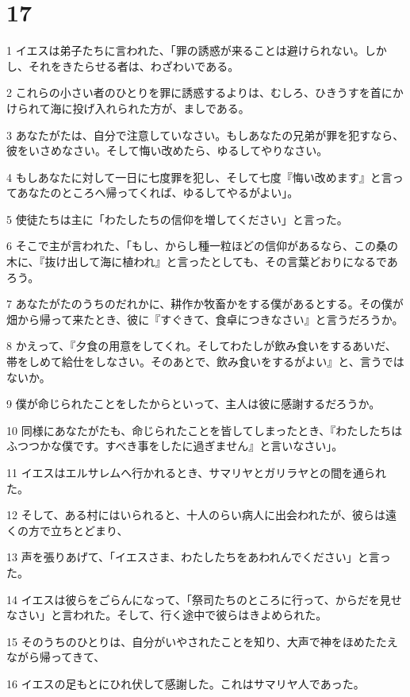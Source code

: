 \chapter{17}

\par 1 イエスは弟子たちに言われた、「罪の誘惑が来ることは避けられない。しかし、それをきたらせる者は、わざわいである。
\par 2 これらの小さい者のひとりを罪に誘惑するよりは、むしろ、ひきうすを首にかけられて海に投げ入れられた方が、ましである。
\par 3 あなたがたは、自分で注意していなさい。もしあなたの兄弟が罪を犯すなら、彼をいさめなさい。そして悔い改めたら、ゆるしてやりなさい。
\par 4 もしあなたに対して一日に七度罪を犯し、そして七度『悔い改めます』と言ってあなたのところへ帰ってくれば、ゆるしてやるがよい」。
\par 5 使徒たちは主に「わたしたちの信仰を増してください」と言った。
\par 6 そこで主が言われた、「もし、からし種一粒ほどの信仰があるなら、この桑の木に、『抜け出して海に植われ』と言ったとしても、その言葉どおりになるであろう。
\par 7 あなたがたのうちのだれかに、耕作か牧畜かをする僕があるとする。その僕が畑から帰って来たとき、彼に『すぐきて、食卓につきなさい』と言うだろうか。
\par 8 かえって、『夕食の用意をしてくれ。そしてわたしが飲み食いをするあいだ、帯をしめて給仕をしなさい。そのあとで、飲み食いをするがよい』と、言うではないか。
\par 9 僕が命じられたことをしたからといって、主人は彼に感謝するだろうか。
\par 10 同様にあなたがたも、命じられたことを皆してしまったとき、『わたしたちはふつつかな僕です。すべき事をしたに過ぎません』と言いなさい」。
\par 11 イエスはエルサレムへ行かれるとき、サマリヤとガリラヤとの間を通られた。
\par 12 そして、ある村にはいられると、十人のらい病人に出会われたが、彼らは遠くの方で立ちとどまり、
\par 13 声を張りあげて、「イエスさま、わたしたちをあわれんでください」と言った。
\par 14 イエスは彼らをごらんになって、「祭司たちのところに行って、からだを見せなさい」と言われた。そして、行く途中で彼らはきよめられた。
\par 15 そのうちのひとりは、自分がいやされたことを知り、大声で神をほめたたえながら帰ってきて、
\par 16 イエスの足もとにひれ伏して感謝した。これはサマリヤ人であった。
